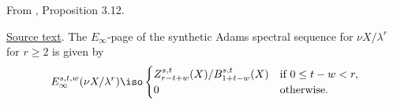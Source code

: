 \begin{proposition}
\label{paper:3.12}
From \cite{LWX126}, Proposition 3.12.\par

\href{paper/main.tex.html#L849}{Source text}.
\label{prop:59f111f}
    The $E_\infty$-page of the synthetic Adams spectral sequence for $\nu X/\lambda^r$ for $r\ge 2$ is given by
    $$E_\infty^{s,t,w}(\nu X/\lambda^r)\iso\begin{cases}
        Z_{r-t+w}^{s,t}(X)/B_{1+t-w}^{s,t}(X) & \text{if } 0\le t-w < r,\\
        0 & \text{otherwise}.
    \end{cases}$$



\end{proposition}
